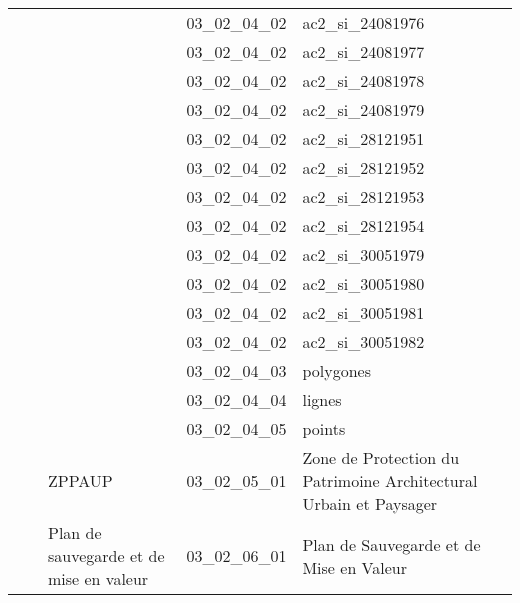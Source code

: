 \documentclass[12pt,titlepage]{book}
\begin{document}
\begin{supertabular}{|p{7.5cm}|p{7.5cm}|p{7.5cm}|c|p{10cm}|}
                   &                    &                    & 03\_02\_04\_02 & ac2\_si\_24081976\\
                   &                    &                    & 03\_02\_04\_02 & ac2\_si\_24081977\\
                   &                    &                    & 03\_02\_04\_02 & ac2\_si\_24081978\\
                   &                    &                    & 03\_02\_04\_02 & ac2\_si\_24081979\\
                   &                    &                    & 03\_02\_04\_02 & ac2\_si\_28121951\\
                   &                    &                    & 03\_02\_04\_02 & ac2\_si\_28121952\\
                   &                    &                    & 03\_02\_04\_02 & ac2\_si\_28121953\\
                   &                    &                    & 03\_02\_04\_02 & ac2\_si\_28121954\\
                   &                    &                    & 03\_02\_04\_02 & ac2\_si\_30051979\\
                   &                    &                    & 03\_02\_04\_02 & ac2\_si\_30051980\\
                   &                    &                    & 03\_02\_04\_02 & ac2\_si\_30051981\\
                   &                    &                    & 03\_02\_04\_02 & ac2\_si\_30051982\\
                   &                    &                    & 03\_02\_04\_03 & polygones\\
                   &                    &                    & 03\_02\_04\_04 & lignes\\
                   &                    &                    & 03\_02\_04\_05 & points\\
                   &                    & ZPPAUP & 03\_02\_05\_01 & Zone de Protection du Patrimoine Architectural Urbain et Paysager\\
                   &                    & Plan de sauvegarde et de mise en valeur & 03\_02\_06\_01 & Plan de Sauvegarde et de Mise en Valeur\\

\end{supertabular}
\end{document}

